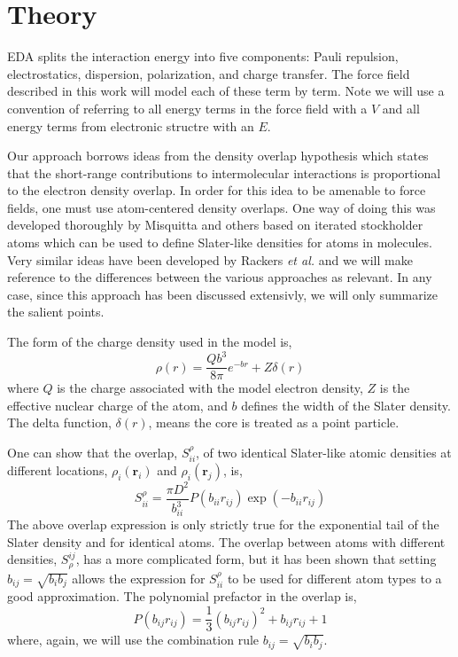 \documentclass[journal=jacsat,manuscript=article]{achemso}
\begin{document}
\section{Theory}
EDA splits the interaction energy into five components: Pauli repulsion,
electrostatics, dispersion, polarization, and charge transfer. The force
field described in this work will model each of these term by term.
Note we will use a convention of referring to all energy
terms in the force field with a $V$ and all energy terms from electronic structre
with an $E$.

Our approach borrows ideas from the density overlap hypothesis\cite{kim1981dependence,wheatley1990overlap,gavezzotti2002calculation,van2016beyond}
which states that the short-range contributions to intermolecular
interactions is proportional to the electron density overlap. In order
for this idea to be amenable to force fields, one must use atom-centered
density overlaps. One way of doing this was developed thoroughly by
Misquitta and others\cite{misquitta2014distributed,misquitta2018isa} based
on iterated stockholder atoms which can be used to define Slater-like
densities for atoms in molecules. Very similar ideas have been developed
by Rackers \textit{et al.}\cite{rackers2021polarizable} and we will make reference to the differences between
the various approaches as relevant. In any case, since this approach has been discussed
extensivly, we will only summarize the salient points.

The form of the charge density used in the model is,
\begin{equation}
  \rho(r)=\frac{Qb^3}{8\pi}e^{-br}+Z\delta(r)
  \label{eq:slater}
\end{equation}
\noindent
where $Q$ is the charge associated with the model electron density,
$Z$ is the effective nuclear charge of the atom, and $b$ defines the width
of the Slater density. The delta function, $\delta(r)$, means the core is
treated as a point particle.

One can show that the overlap, $S_{ii}^\rho$, of two identical Slater-like atomic densities
at different locations, $\rho_i(\bm{r}_i)$ and $\rho_i(\bm{r}_j)$, is,
\begin{equation}
  S_{ii}^\rho=\frac{\pi D^2}{b_{ii}^3}P(b_{ii}r_{ij})\exp(-b_{ii}r_{ij})
\end{equation}
The above overlap expression is only strictly true for the exponential tail
of the Slater density and for identical atoms. The overlap between atoms
with different densities, $S^{ij}_\rho$, has a more complicated form, but
it has been shown that setting $b_{ij}=\sqrt{b_ib_j}$ allows the expression
for $S_{ii}^\rho$ to be used for different atom types to a good
approximation\cite{van2016beyond}. The polynomial prefactor in the overlap is,
\begin{equation}
  P(b_{ij}r_{ij})=\frac13(b_{ij}r_{ij})^2 + b_{ij}r_{ij}+1
\end{equation}
where, again, we will use the combination rule $b_{ij}=\sqrt{b_ib_j}$.
\end{document}

